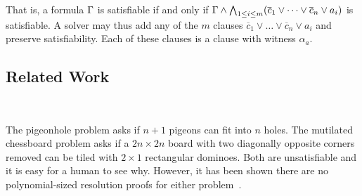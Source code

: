 That is, a formula $\Gamma$ is satisfiable if and only if $\Gamma \land \bigwedge_{1 \leq i \leq m} (\overline{c}_1 \lor \dots \lor \overline{c}_n \lor a_i)$ is satisfiable. A solver may thus add any of the $m$ clauses $\overline{c}_1 \lor \dots \lor \overline{c}_n \lor a_i$ and preserve satisfiability. Each of these clauses is a \pr clause with witness $\alpha_a$.



   




\subsection{Related Work}~\label{subsec:relatedwork}

The pigeonhole problem asks if $n+1$ pigeons can fit into $n$ holes. The
mutilated chessboard problem asks if a $2n \times 2n$ board with two diagonally
opposite corners removed can be tiled with $2 \times 1$ rectangular dominoes.
Both are unsatisfiable and it is easy for a human to see why. However, it has
been shown there are no polynomial-sized resolution proofs for either
problem~\cite{hakenpigeonhole,mutilatedchessboard-exponential}.


